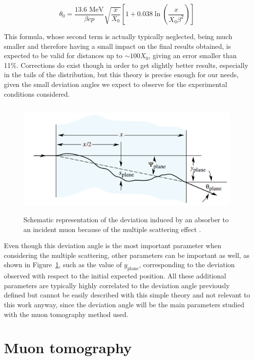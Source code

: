 \documentclass[a4paper, 11pt]{report}
\begin{document}
\begin{equation}
\label{eq:Moliere}
\theta_0 = \frac{13.6 \text{ MeV}}{\beta c p} \sqrt{\frac{x}{X_0}} \left [1 + 0.038 \ln \left (\frac{x}{X_0 \beta^2} \right ) \right ]
\end{equation}

This formula, whose second term is actually typically neglected, being much smaller and therefore having a small impact on the final results obtained, is expected to be valid for distances up to $\sim 100 X_0$, giving an error smaller than 11\%. Corrections do exist though in order to get slightly better results, especially in the tails of the distribution, but this theory is precise enough for our needs, given the small deviation angles we expect to observe for the experimental conditions considered.

\begin{figure}[htbp]
\begin{center}
\includegraphics[width=12.5cm, height=5.8cm]{figs/moliere.png}
\caption{Schematic representation of the deviation induced by an absorber to an incident muon because of the multiple scattering effect \cite{PDGScat}.}
\label{figure:Moliere}
\end{center}
\end{figure}

Even though this deviation angle is the most important parameter when considering the multiple scattering, other parameters can be important as well, as shown in Figure~\ref{figure:Moliere}, such as the value of $y_\text{plane}$, corresponding to the deviation observed with respect to the initial expected position. All these additional parameters are typically highly correlated to the deviation angle previously defined but cannot be easily described with this simple theory and not relevant to this work anyway, since the deviation angle will be the main parameters studied with the muon tomography method used.

\section{Muon tomography} \label{sec:tomography}
\end{document}
